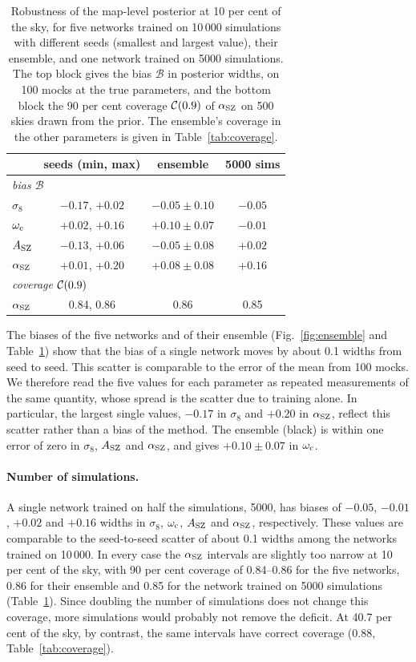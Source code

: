 \begin{table}
\centering
\caption{Robustness of the map-level posterior at 10 per cent of the sky, for five networks trained on
10\,000 simulations with different seeds (smallest and largest value), their ensemble, and one network
trained on 5000 simulations. The top block gives the bias $\mathcal{B}$ in posterior widths, on 100 mocks
at the true parameters, and the bottom block the 90 per cent coverage $\mathcal{C}(0.9)$ of $\alpha_\mathrm{SZ}$ on 500 skies
drawn from the prior. The ensemble's coverage in the other parameters is given in Table~\ref{tab:coverage}.}
\label{tab:robust}
\small
\setlength{\tabcolsep}{3pt}
\begin{tabular}{lccc}
\toprule
 & seeds (min, max) & ensemble & 5000 sims \\
\midrule
\multicolumn{4}{l}{\emph{bias $\mathcal{B}$}}\\
$\sigma_8$ & $-0.17$, $+0.02$ & $-0.05\pm0.10$ & $-0.05$ \\
$\omega_\mathrm{c}$     & $+0.02$, $+0.16$ & $+0.10\pm0.07$ & $-0.01$ \\
$A_\mathrm{SZ}$     & $-0.13$, $+0.06$ & $-0.05\pm0.08$ & $+0.02$ \\
$\alpha_\mathrm{SZ}$    & $+0.01$, $+0.20$ & $+0.08\pm0.08$ & $+0.16$ \\
\midrule
\multicolumn{4}{l}{\emph{coverage $\mathcal{C}(0.9)$}}\\
$\alpha_\mathrm{SZ}$    & 0.84, 0.86 & 0.86 & 0.85 \\
\bottomrule
\end{tabular}
\end{table}

The biases of the five networks and of their ensemble (Fig.~\ref{fig:ensemble} and
Table~\ref{tab:robust}) show that the bias of a single network moves by about 0.1 widths from seed to seed.
This scatter is comparable to the error of the mean from 100 mocks. We therefore read the five values for each
parameter as repeated measurements of the same quantity, whose spread is the scatter due to training
alone. In particular, the largest single values, $-0.17$ in $\sigma_8$ and $+0.20$ in $\alpha_\mathrm{SZ}$, reflect this
scatter rather than a bias of the method. The ensemble (black) is within one error of zero in $\sigma_8$,
$A_\mathrm{SZ}$ and $\alpha_\mathrm{SZ}$, and gives $+0.10\pm0.07$ in $\omega_\mathrm{c}$.

\paragraph*{Number of simulations.} A single network trained on half the simulations, 5000, has biases of
$-0.05$, $-0.01$, $+0.02$ and $+0.16$ widths in $\sigma_8$, $\omega_\mathrm{c}$, $A_\mathrm{SZ}$ and $\alpha_\mathrm{SZ}$, respectively. These
values are comparable to the seed-to-seed scatter of about 0.1 widths among the networks trained on 10\,000. In
every case the $\alpha_\mathrm{SZ}$ intervals are slightly too narrow at 10 per cent of the sky, with 90 per cent
coverage of 0.84--0.86 for the five networks, 0.86 for their ensemble and 0.85 for the network trained on
5000 simulations (Table~\ref{tab:robust}). Since doubling the number of simulations does not change this
coverage, more simulations would probably not remove the deficit. At 40.7 per cent of the sky, by
contrast, the same intervals have correct coverage (0.88, Table~\ref{tab:coverage}).

